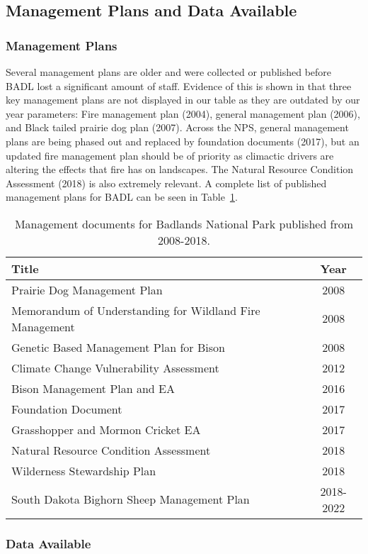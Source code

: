 \subsection{Management Plans and Data Available}

\subsubsection{Management Plans}

Several management plans are older and were collected or published before BADL lost a significant amount of staff.
Evidence of this is shown in that three key management plans are not displayed in our table as they are outdated by our year parameters: Fire management plan (2004), general management plan (2006), and Black tailed prairie dog plan (2007). 
Across the NPS, general management plans are being phased out and replaced by foundation documents (2017), but an updated fire management plan should be of priority as climactic drivers are altering the effects that fire has on landscapes. 
The Natural Resource Condition Assessment (2018) is also extremely relevant.
A complete list of published management plans for BADL can be seen in Table~\ref{tab:BADLManDocs}.

\begin{table}[h]
	\centering
\caption[BADL management documents]
	{Management documents for Badlands National Park published from 2008-2018.} 
\label{tab:BADLManDocs}
\begin{tabular}{lc}
\toprule
Title & Year\tabularnewline
\midrule
Prairie Dog Management Plan & 2008 \tabularnewline
Memorandum of Understanding for Wildland Fire Management & 2008 \tabularnewline
Genetic Based Management Plan for Bison & 2008 \tabularnewline
Climate Change Vulnerability Assessment & 2012 \tabularnewline
Bison Management Plan and EA & 2016 \tabularnewline
Foundation Document & 2017 \tabularnewline
Grasshopper and Mormon Cricket EA  & 2017 \tabularnewline
Natural Resource Condition Assessment & 2018 \tabularnewline
Wilderness Stewardship Plan & 2018 \tabularnewline
South Dakota Bighorn Sheep Management Plan & 2018-2022 \tabularnewline
\bottomrule
\end{tabular}
\end{table}

\subsubsection{Data Available}

